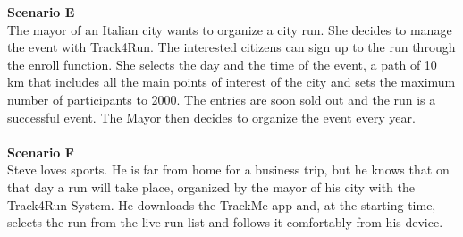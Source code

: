 \textbf{Scenario E} \\  
    The mayor of an Italian city wants to organize a city run. She decides to manage the event with Track4Run. The interested citizens can sign up to the run through the enroll function. She selects the day and the time of the event, a path of 10 km that includes all the main points of interest of the city and sets the maximum number of participants to 2000. The entries are soon sold out and the run is a successful event. The Mayor then decides to organize the event every year. \\ \\
\textbf{Scenario F} \\ 
    Steve loves sports. He is far from home for a business trip, but he knows that on that day a run will take place, organized by the mayor of his city with the Track4Run System. He downloads the TrackMe app and, at the starting time, selects the run from the live run list and follows it comfortably from his device. 



